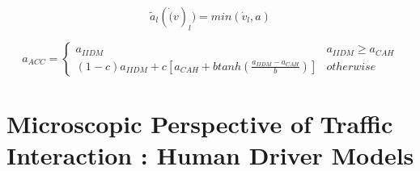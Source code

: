 \documentclass[11pt]{article}
\begin{document}
$$\tilde{a}_l(\dot(v)_l) = min(\dot{v}_l, a)$$

$$a_{ACC}= \begin{cases}
a_{IIDM} & a_{IIDM} \ge a_{CAH}\\
(1-c)a_{IIDM} + c\left[a_{CAH} + b tanh(\frac{a_{IIDM}-a_{CAH}}{b}) \right] & otherwise
\end{cases}$$

%
%
%
%
%

\section{Microscopic Perspective of Traffic Interaction : Human Driver Models}
\end{document}
